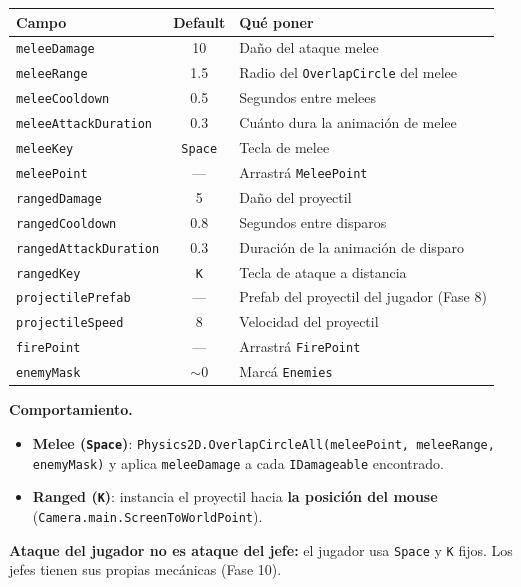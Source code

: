 \documentclass[a4paper,12pt]{article}
\newcommand{\code}[1]{\texttt{#1}}
\begin{document}
\begin{center}
\begin{longtable}{|l|c|p{6.2cm}|}
\hline
\textbf{Campo} & \textbf{Default} & \textbf{Qué poner} \\
\hline
\endhead
\code{meleeDamage} & 10 & Daño del ataque melee \\
\hline
\code{meleeRange} & 1.5 & Radio del \code{OverlapCircle} del melee \\
\hline
\code{meleeCooldown} & 0.5 & Segundos entre melees \\
\hline
\code{meleeAttackDuration} & 0.3 & Cuánto dura la animación de melee \\
\hline
\code{meleeKey} & \code{Space} & Tecla de melee \\
\hline
\code{meleePoint} & --- & Arrastrá \code{MeleePoint} \\
\hline
\code{rangedDamage} & 5 & Daño del proyectil \\
\hline
\code{rangedCooldown} & 0.8 & Segundos entre disparos \\
\hline
\code{rangedAttackDuration} & 0.3 & Duración de la animación de disparo \\
\hline
\code{rangedKey} & \code{K} & Tecla de ataque a distancia \\
\hline
\code{projectilePrefab} & --- & Prefab del proyectil del jugador (Fase 8) \\
\hline
\code{projectileSpeed} & 8 & Velocidad del proyectil \\
\hline
\code{firePoint} & --- & Arrastrá \code{FirePoint} \\
\hline
\code{enemyMask} & $\sim$0 & Marcá \code{Enemies} \\
\hline
\end{longtable}
\end{center}

\textbf{Comportamiento.}

\begin{itemize}
    \item \textbf{Melee (\code{Space})}: \code{Physics2D.OverlapCircleAll(meleePoint, meleeRange, enemyMask)} y aplica \code{meleeDamage} a cada \code{IDamageable} encontrado.
    \item \textbf{Ranged (\code{K})}: instancia el proyectil hacia \textbf{la posición del mouse} (\code{Camera.main.ScreenToWorldPoint}).
\end{itemize}

\textbf{Ataque del jugador no es ataque del jefe:} el jugador usa \code{Space} y \code{K} fijos.
Los jefes tienen sus propias mecánicas (Fase 10).
\end{document}
